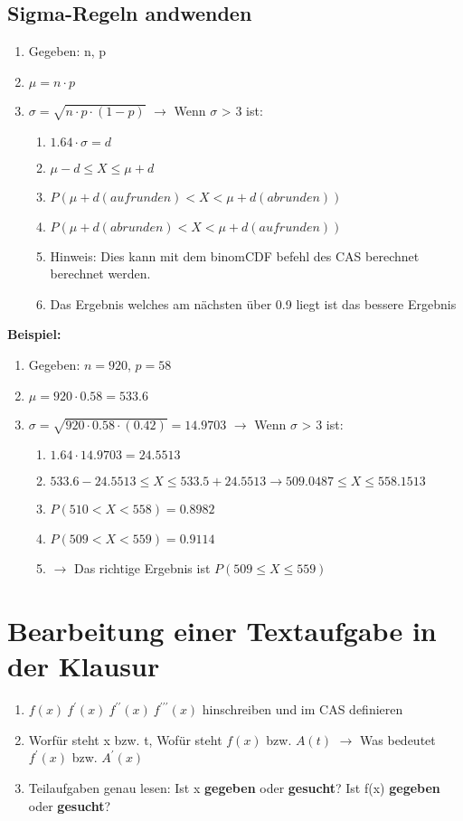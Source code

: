\documentclass[a4paper,12pt]{article}
\begin{document}
	\subsection*{Sigma-Regeln andwenden}
		\begin{enumerate}
			\item Gegeben: n, p
			\item $ \mu = n \cdot p$
			\item $\sigma = \sqrt{n \cdot p \cdot (1-p)}$ $\rightarrow$ Wenn $\sigma$ > 3 ist:
			\begin{enumerate}
				\item $1.64 \cdot \sigma = d$
				\item $\mu -d \leq X \leq \mu + d$
				\item $P(\mu + d (aufrunden) < X <\mu + d (abrunden))$
				\item $P(\mu + d (abrunden) < X <\mu + d (aufrunden))$
				\item Hinweis: Dies kann mit dem binomCDF befehl des CAS berechnet berechnet werden.
				\item Das Ergebnis welches am nächsten über 0.9 liegt ist das bessere Ergebnis
			\end{enumerate}
		\end{enumerate}
	\textbf{Beispiel:}
	\begin{enumerate}
			\item Gegeben: $n = 920$,  $p = 58$
			\item $ \mu = 920 \cdot 0.58 = 533.6$
			\item $\sigma = \sqrt{920 \cdot 0.58 \cdot (0.42)} = 14.9703$ $\rightarrow$ Wenn $\sigma$ > 3 ist:
			\begin{enumerate}
				\item $1.64 \cdot 14.9703 = 24.5513$
				\item $533.6 - 24.5513 \leq X \leq 533.5 + 24.5513 \rightarrow 509.0487 \leq X \leq 558.1513$
				\item $P(510 < X < 558) = 0.8982$
				\item $P(509 < X <559) = 0.9114$
				\item $\rightarrow$ Das richtige Ergebnis ist $P(509 \leq X \leq 559)$
			\end{enumerate}
		\end{enumerate}
	\section*{Bearbeitung einer Textaufgabe in der Klausur}
	\begin{enumerate}
		\item $f(x) \ f^{\prime}(x) \ f^{\prime\prime}(x) \ f^{\prime\prime\prime}(x)$ hinschreiben und im CAS definieren
		\item Worfür steht x bzw. t, Wofür steht $f(x)$ bzw. $A(t)$ $\rightarrow$ Was bedeutet $f^{\prime}(x)$ bzw. $A^{\prime}(x)$
		\item Teilaufgaben genau lesen: Ist x \textbf{gegeben} oder \textbf{gesucht}? Ist f(x) \textbf{gegeben} oder \textbf{gesucht}?	
	\end{enumerate}	
\end{document}
